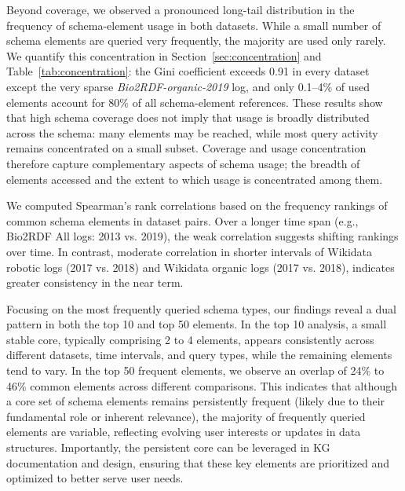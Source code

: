 \documentclass[sw]{iosart2x}
\begin{document}
Beyond coverage, we observed a pronounced long-tail distribution in the frequency of schema-element usage in both datasets. While a small number of schema elements are queried very frequently, the majority are used only rarely. We quantify this concentration in Section~\ref{sec:concentration} and Table~\ref{tab:concentration}: the Gini coefficient exceeds 0.91 in every dataset except the very sparse \emph{Bio2RDF-organic-2019} log, and only 0.1--4\% of used elements account for 80\% of all schema-element references. These results show that high schema coverage does not imply that usage is broadly distributed across the schema: many elements may be reached, while most query activity remains concentrated on a small subset. Coverage and usage concentration therefore capture complementary aspects of schema usage; the breadth of elements accessed and the extent to which usage is concentrated among them.

We computed Spearman’s rank correlations based on the frequency rankings of common schema elements in dataset pairs. Over a longer time span (e.g., Bio2RDF All logs: 2013 vs. 2019), the weak correlation suggests shifting rankings over time. In contrast, moderate correlation in shorter intervals of Wikidata robotic logs (2017 vs. 2018) and Wikidata organic logs (2017 vs. 2018), indicates greater consistency in the near term.

Focusing on the most frequently queried schema types, our findings reveal a dual pattern in both the top 10 and top 50 elements. In the top 10 analysis, a small stable core, typically comprising 2 to 4 elements, appears consistently across different datasets, time intervals, and query types, while the remaining elements tend to vary. In the top 50 frequent elements, we observe an overlap of 24\% to 46\% common elements across different comparisons. This indicates that although a core set of schema elements remains persistently frequent (likely due to their fundamental role or inherent relevance), the majority of frequently queried elements are variable, reflecting evolving user interests or updates in data structures. Importantly, the persistent core can be leveraged in KG documentation and design, ensuring that these key elements are prioritized and optimized to better serve user needs.
\end{document}
